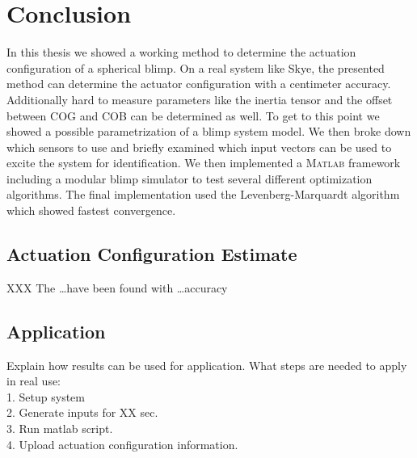 \chapter{Conclusion}
\label{chap:conclusion}

In this thesis we showed a working method to determine the actuation configuration of a spherical blimp.
On a real system like Skye, the presented method can determine the actuator configuration with a centimeter accuracy.
Additionally hard to measure parameters like the inertia tensor and the offset between COG and COB can be determined as well.
To get to this point we showed a possible parametrization of a blimp system model.
We then broke down which sensors to use and briefly examined which input vectors can be used to excite the system for identification.
We then implemented a \textsc{Matlab} framework including a modular blimp simulator to test several different optimization algorithms.
The final implementation used the Levenberg-Marquardt algorithm which showed fastest convergence.\\



\section{Actuation Configuration Estimate}
XXX
The \dots have been found with \dots accuracy


\section{Application}
Explain how results can be used for application.
What steps are needed to apply in real use: \\
1. Setup system \\
2. Generate inputs for XX sec. \\
3. Run matlab script. \\
4. Upload actuation configuration information.

